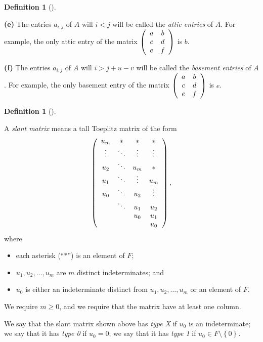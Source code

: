 \documentclass[numbers=enddot,12pt,final,onecolumn,notitlepage]{scrartcl}%
\theoremstyle{definition}
\newtheorem{defi}[theo]{Definition}
\newenvironment{definition}[1][]
{\begin{defi}[#1]\begin{leftbar}}
{\end{leftbar}\end{defi}}
\renewcommand{\geq}{\geqslant}
\theoremstyle{plainsl}
\begin{document}
\begin{definition}
\textbf{(e)} The entries $a_{i,j}$ of $A$ will $i<j$ will be called the
\emph{attic entries} of $A$. For example, the only attic entry of the matrix
$\left(
\begin{array}
[c]{cc}%
a & b\\
c & d\\
e & f
\end{array}
\right)  $ is $b$.

\textbf{(f)} The entries $a_{i,j}$ of $A$ will $i>j+u-v$ will be called the
\emph{basement entries} of $A$. For example, the only basement entry of the
matrix $\left(
\begin{array}
[c]{cc}%
a & b\\
c & d\\
e & f
\end{array}
\right)  $ is $e$.
\end{definition}

\begin{definition}
\label{def.slant}
A \emph{slant matrix} means a tall Toeplitz matrix of the form%
\[
\left(
\begin{array}
[c]{cccc}%
u_{m} & \ast & \ast & \ast\\
\vdots & \ddots & \vdots & \vdots\\
u_{2} & \ddots & u_{m} & \ast\\
u_{1} & \ddots & \vdots & u_{m}\\
u_{0} & \ddots & u_{2} & \vdots\\
& \ddots & u_{1} & u_{2}\\
&  & u_{0} & u_{1}\\
&  &  & u_{0}%
\end{array}
\right)  ,
\]
where

\begin{itemize}
\item each asterisk (``$\ast$'') is an element
of $F$;

\item $u_{1},u_{2},\ldots,u_{m}$ are $m$ distinct indeterminates; and

\item $u_{0}$ is either an indeterminate distinct from $u_{1},u_{2}%
,\ldots,u_{m}$ or an element of $F$.
\end{itemize}

We require $m\geq0$, and we require that the matrix have at least one column.

We say that the slant matrix shown above has \emph{type X} if $u_{0}$ is an
indeterminate; we say that it has \emph{type 0} if $u_{0}=0$; we say that it
has \emph{type 1} if $u_{0}\in F\setminus\left\{  0\right\}  $.
\end{definition}
\end{document}
